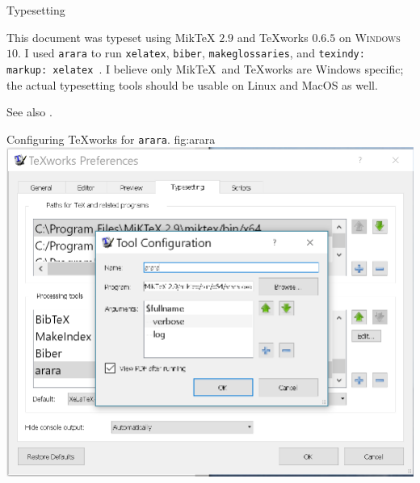 \begin{plSection}{Typesetting}

This document was typeset using Mik\TeX{} $2.9$ \cite{Schenk:2017:Miktex} 
and {\TeX}works $0.6.5$ \cite{KewLoffler:2017:Texworks} 
on \textsc{Windows} $10$. 
I used \texttt{arara} \cite{CeredaEtAl:2021:Arara} 
to run \texttt{xelatex}, \texttt{biber}, \texttt{makeglossaries},  and
\texttt{texindy: { markup: xelatex }}.
I believe only Mik\TeX\  and {\TeX}works are Windows specific; 
the actual typesetting tools should be usable on Linux and MacOS as well.

See also \cite{Talbot:2012:LatexNovices,Talbot:2013:LatexPhD}.

\begin{plScreen}
{Configuring {\TeX}works for \texttt{arara}.}
{fig:arara}
\centering
\includegraphics[scale=0.75]{../figs/arara.png}
\end{plScreen}
\vfill
\end{plSection}%
